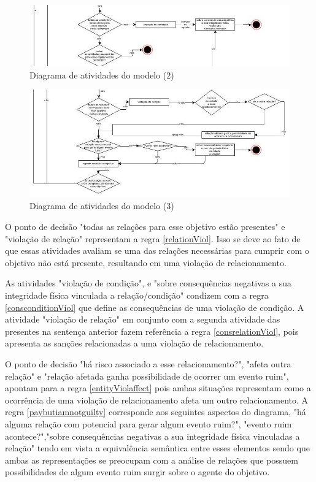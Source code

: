 \begin{figure}[H]
  \centering
  \includegraphics[width=1.1\linewidth]{figure/diag2.jpg} 
  \caption{Diagrama de atividades do modelo (2)}
  \label{atividiagram2}
\end{figure}

\begin{figure}[H]
  \centering
  \includegraphics[width=1.1\linewidth]{figure/diag3.jpg} 
  \caption{Diagrama de atividades do modelo (3)}
  \label{atividiagram3}
\end{figure}


O ponto de decisão "todas as relações para esse objetivo estão presentes" e "violação de relação" representam a regra \ref{relationViol}. Isso se deve ao fato de que essas atividades avaliam se uma das relações necessárias para cumprir com o objetivo não está presente, resultando em uma violação de relacionamento. 

As atividades "violação de condição", e "sobre consequências negativas a sua integridade física vinculada a relação/condição" condizem com a regra \ref{consconditionViol} que define as consequências de uma violação de condição. A atividade "violação de relação" em conjunto com a segunda atividade das presentes na sentença anterior fazem referência a regra \ref{consrelationViol}, pois apresenta as sanções relacionadas a uma violação de relacionamento. 

O ponto de decisão "há risco associado a esse relacionamento?", "afeta  outra relação" e "relação afetada ganha possibilidade de ocorrer um evento ruim", apontam para a regra \ref{entityViolaffect} pois ambas situações representam como a ocorrência de uma violação de relacionamento afeta um outro relacionamento. A regra \ref{paybutiamnotguilty} corresponde aos seguintes aspectos do diagrama, "há alguma relação com potencial para gerar algum evento ruim?", "evento ruim acontece?","sobre consequências negativas a sua integridade física vinculadas a relação" tendo em vista a equivalência semântica entre esses elementos sendo que ambas as representações se preocupam com a análise de relações que possuem possibilidades de algum evento ruim surgir sobre o agente do objetivo. 

